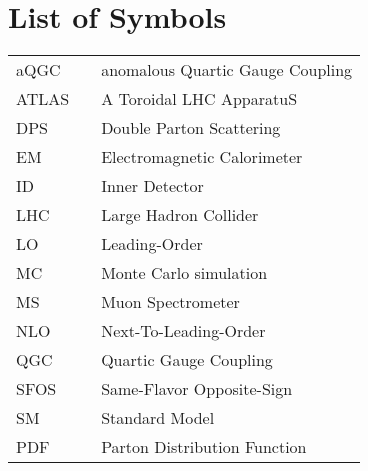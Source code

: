 \chapter*{List of Symbols}
  \begin{tabular}{lp{}p{}}
    aQGC        & \dotfill & anomalous Quartic Gauge Coupling \\
    ATLAS       & \dotfill & A Toroidal LHC ApparatuS \\
    DPS         & \dotfill & Double Parton Scattering \\
    EM          & \dotfill & Electromagnetic Calorimeter \\
    ID          & \dotfill & Inner Detector \\
    LHC         & \dotfill & Large Hadron Collider \\
    LO          & \dotfill & Leading-Order \\
    MC          & \dotfill & Monte Carlo simulation \\
    MS          & \dotfill & Muon Spectrometer \\
    NLO         & \dotfill & Next-To-Leading-Order \\
    QGC         & \dotfill & Quartic Gauge Coupling \\
    SFOS        & \dotfill & Same-Flavor Opposite-Sign \\
    SM          & \dotfill & Standard Model  \\
    PDF         & \dotfill & Parton Distribution Function \\



  \end{tabular}
